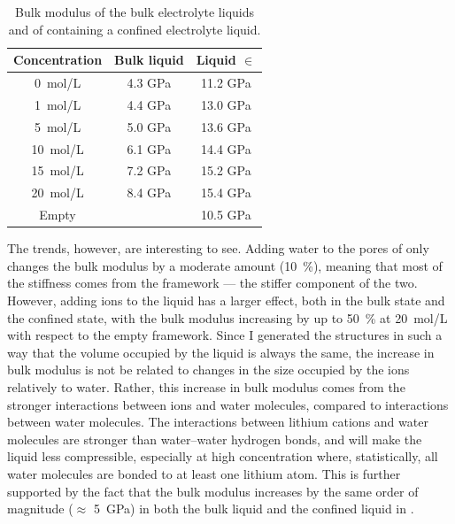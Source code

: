 \documentclass[thesis]{subfiles}
\begin{document}
\begin{table}[ht]
    \caption{Bulk modulus of the bulk electrolyte liquids and of 
    containing a confined electrolyte liquid.}
    \label{table:bulk}
    \centering
    \renewcommand{\arraystretch}{1.1}
    \begin{tabular}{c c c}
        \toprule
        Concentration   & Bulk liquid  & Liquid $\in$ \ZIF8 \\
        \midrule
        \SI{0}{mol/L}   &    4.3 GPa   &  11.2 GPa    \\
        \SI{1}{mol/L}   &    4.4 GPa   &  13.0 GPa    \\
        \SI{5}{mol/L}   &    5.0 GPa   &  13.6 GPa    \\
        \SI{10}{mol/L}  &    6.1 GPa   &  14.4 GPa    \\
        \SI{15}{mol/L}  &    7.2 GPa   &  15.2 GPa    \\
        \SI{20}{mol/L}  &    8.4 GPa   &  15.4 GPa    \\
        \bottomrule
        Empty \ZIF8     &              &  10.5 GPa     \\
        \bottomrule
    \end{tabular}
\end{table}

The trends, however, are interesting to see. Adding water to the pores of 
only changes the bulk modulus by a moderate amount (10~\%), meaning that most of
the stiffness comes from the  framework --- the stiffer component of the
two. However, adding ions to the liquid has a larger effect, both in the bulk
state and the confined state, with the bulk modulus increasing by up to 50~\% at
\SI{20}{mol/L} with respect to the empty framework. Since I generated the
structures in such a way that the volume occupied by the liquid is always the
same, the increase in bulk modulus is not be related to changes in the size
occupied by the ions relatively to water. Rather, this increase in bulk modulus
comes from the stronger interactions between ions and water molecules, compared
to interactions between water molecules. The interactions between lithium
cations and water molecules are stronger than water--water hydrogen bonds, and
will make the liquid less compressible, especially at high concentration where,
statistically, all water molecules are bonded to at least one lithium atom. This
is further supported by the fact that the bulk modulus increases by the same
order of magnitude ($\approx$ \SI{5}{GPa}) in both the bulk liquid and the
confined liquid in .
\end{document}
